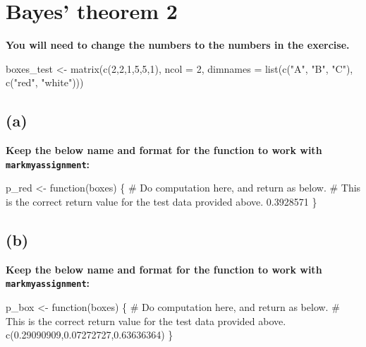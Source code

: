 \documentclass[
]{article}
\newenvironment{Shaded}{\begin{snugshade}}{\end{snugshade}}
\newcommand{\AttributeTok}[1]{\textcolor[rgb]{0.40,0.45,0.13}{#1}}
\newcommand{\CommentTok}[1]{\textcolor[rgb]{0.37,0.37,0.37}{#1}}
\newcommand{\ControlFlowTok}[1]{\textcolor[rgb]{0.00,0.23,0.31}{#1}}
\newcommand{\DecValTok}[1]{\textcolor[rgb]{0.68,0.00,0.00}{#1}}
\newcommand{\FloatTok}[1]{\textcolor[rgb]{0.68,0.00,0.00}{#1}}
\newcommand{\FunctionTok}[1]{\textcolor[rgb]{0.28,0.35,0.67}{#1}}
\newcommand{\NormalTok}[1]{\textcolor[rgb]{0.00,0.23,0.31}{#1}}
\newcommand{\OtherTok}[1]{\textcolor[rgb]{0.00,0.23,0.31}{#1}}
\newcommand{\StringTok}[1]{\textcolor[rgb]{0.13,0.47,0.30}{#1}}
\begin{document}
\hypertarget{bayes-theorem-2}{%
\section{Bayes' theorem 2}\label{bayes-theorem-2}}

\textbf{You will need to change the numbers to the numbers in the
exercise.}

\begin{Shaded}
\begin{Highlighting}[]
\NormalTok{boxes\_test }\OtherTok{\textless{}{-}} \FunctionTok{matrix}\NormalTok{(}\FunctionTok{c}\NormalTok{(}\DecValTok{2}\NormalTok{,}\DecValTok{2}\NormalTok{,}\DecValTok{1}\NormalTok{,}\DecValTok{5}\NormalTok{,}\DecValTok{5}\NormalTok{,}\DecValTok{1}\NormalTok{), }\AttributeTok{ncol =} \DecValTok{2}\NormalTok{,}
    \AttributeTok{dimnames =} \FunctionTok{list}\NormalTok{(}\FunctionTok{c}\NormalTok{(}\StringTok{"A"}\NormalTok{, }\StringTok{"B"}\NormalTok{, }\StringTok{"C"}\NormalTok{), }\FunctionTok{c}\NormalTok{(}\StringTok{"red"}\NormalTok{, }\StringTok{"white"}\NormalTok{)))}
\end{Highlighting}
\end{Shaded}

\hypertarget{a-1}{%
\subsection{(a)}\label{a-1}}

\textbf{Keep the below name and format for the function to work with
\texttt{markmyassignment}:}

\begin{Shaded}
\begin{Highlighting}[]
\NormalTok{p\_red }\OtherTok{\textless{}{-}} \ControlFlowTok{function}\NormalTok{(boxes) \{}
    \CommentTok{\# Do computation here, and return as below.}
    \CommentTok{\# This is the correct return value for the test data provided above.}
    \FloatTok{0.3928571}
\NormalTok{\}}
\end{Highlighting}
\end{Shaded}

\hypertarget{b-1}{%
\subsection{(b)}\label{b-1}}

\textbf{Keep the below name and format for the function to work with
\texttt{markmyassignment}:}

\begin{Shaded}
\begin{Highlighting}[]
\NormalTok{p\_box }\OtherTok{\textless{}{-}} \ControlFlowTok{function}\NormalTok{(boxes) \{}
    \CommentTok{\# Do computation here, and return as below.}
    \CommentTok{\# This is the correct return value for the test data provided above.}
    \FunctionTok{c}\NormalTok{(}\FloatTok{0.29090909}\NormalTok{,}\FloatTok{0.07272727}\NormalTok{,}\FloatTok{0.63636364}\NormalTok{)}
\NormalTok{\}}
\end{Highlighting}
\end{Shaded}
\end{document}

